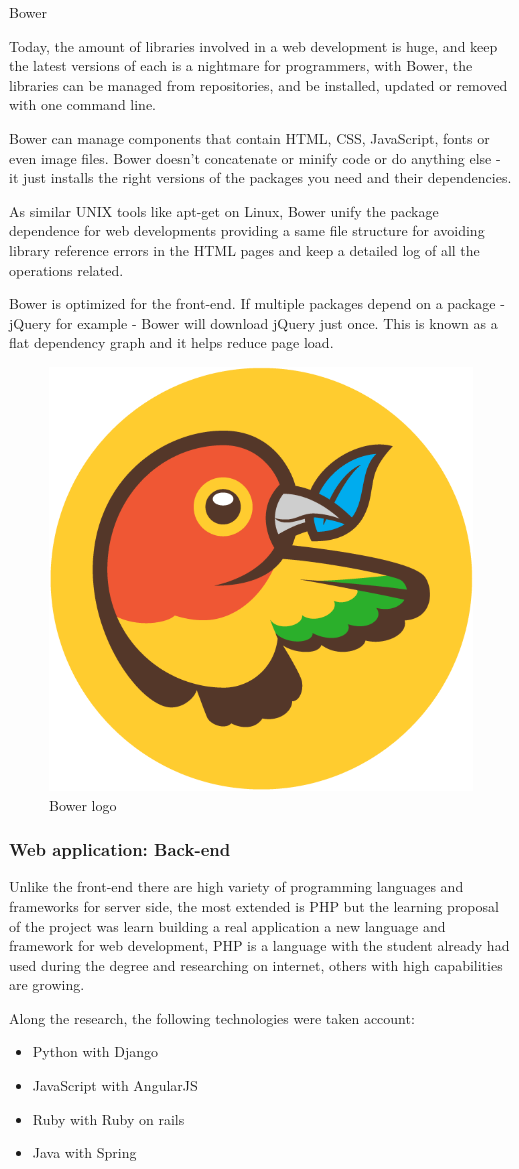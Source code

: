 \documentclass{DeustoFDP}
\begin{document}
{\large Bower}

Today, the amount of libraries involved in a web development is huge, and keep the latest versions of each is a nightmare for programmers, with Bower, the libraries can be managed from repositories, and be installed, updated or removed with one command line.

Bower can manage components that contain HTML, CSS, JavaScript, fonts or even image files. Bower doesn’t concatenate or minify code or do anything else - it just installs the right versions of the packages you need and their dependencies.

As similar UNIX tools like apt-get on Linux, Bower unify the package dependence for web developments providing a same file structure for avoiding library reference errors in the HTML pages and keep a detailed log of all the operations related.

Bower is optimized for the front-end. If multiple packages depend on a package - jQuery for example - Bower will download jQuery just once. This is known as a flat dependency graph and it helps reduce page load. \cite{bowerio}

\begin{figure}[h]
\centering
\includegraphics[width=0.3\linewidth]{fig/Bower}
\caption[Bower logo]{Bower logo}
\label{fig:Bower}
\end{figure}


\subsubsection{Web application: Back-end}
Unlike the front-end there are high variety of programming languages and frameworks for server side, the most extended is PHP but the learning proposal of the project was learn building a real application a new language and framework for web development, PHP is a language with the student already had used during the degree and researching on internet, others with high capabilities are growing.

Along the research, the following technologies were taken account:
\begin{itemize}
	\item Python with Django
	\item JavaScript with AngularJS
	\item Ruby with Ruby on rails
	\item Java with Spring
\end{itemize}
\end{document}
